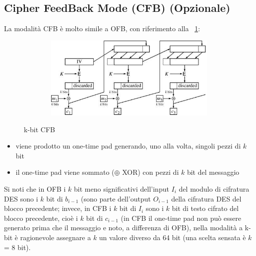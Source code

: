 \subsection{Cipher FeedBack Mode (CFB) (Opzionale)}
La modalità CFB è molto simile a OFB, con riferimento alla \figurename ~\ref{fig:k-bit_CFB}:
\begin{figure}[htbp]
	\centering%
	\subfigure%
	{\includegraphics[height=4cm, width=12cm, keepaspectratio]{Immagini/modalita_operative/k-bit_CFB.png}}
	\caption{k-bit CFB \label{fig:k-bit_CFB}} 	
\end{figure}
\begin{itemize}
\item viene prodotto un one-time pad generando, uno alla volta, singoli pezzi di $k$ bit
\item il one-time pad viene sommato ($\oplus$ XOR) con pezzi di $k$ bit del messaggio
\end{itemize}
Si noti che in OFB i $k$ bit meno significativi dell'input $I_{i}$ del modulo di cifratura DES sono i $k$ bit di $b_{i-1}$ (sono parte dell'output $O_{i-1}$ della cifratura DES del blocco precedente; invece, in CFB i $k$ bit di $I_{i}$ sono i $k$ bit di testo cifrato del blocco precedente, cioè i $k$ bit di $c_{i-1}$ (in CFB il one-time pad non può essere generato prima che il messaggio e noto, a differenza di OFB), nella modalità a k-bit è ragionevole assegnare a $k$ un valore diverso da 64 bit (una scelta sensata è $k$ = 8 bit).
